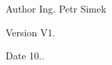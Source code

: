 \begin{DoxyAuthor}{Author}
Ing. Petr Simek 
\end{DoxyAuthor}
\begin{DoxyVersion}{Version}
V1. 
\end{DoxyVersion}
\begin{DoxyDate}{Date}
10.. 
\end{DoxyDate}
